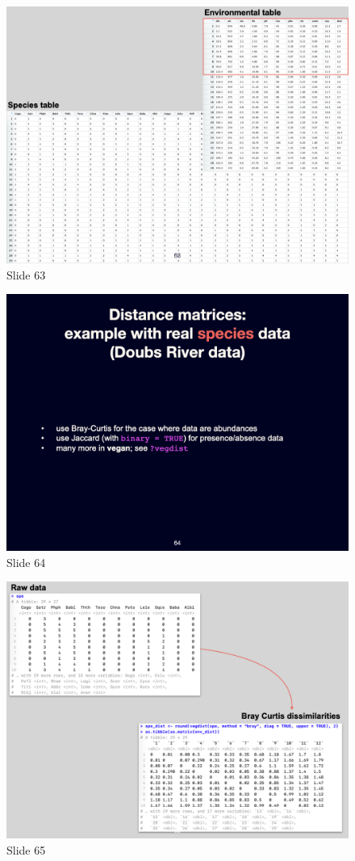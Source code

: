 \documentclass[
  12pt,
]{book}
\begin{document}
\begin{figure}[ht]
\centering
\includegraphics[width=0.8\linewidth]{../images/BDC334/BDC334-063.jpeg}
\caption*{Slide 63}
\end{figure}

\begin{figure}[ht]
\centering
\includegraphics[width=0.8\linewidth]{../images/BDC334/BDC334-064.jpeg}
\caption*{Slide 64}
\end{figure}

\begin{figure}[ht]
\centering
\includegraphics[width=0.8\linewidth]{../images/BDC334/BDC334-065.jpeg}
\caption*{Slide 65}
\end{figure}
\end{document}
